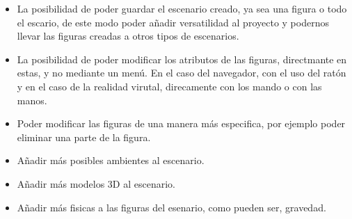 \documentclass[a4paper, 12pt]{book}
\begin{document}
\begin{itemize}
    \item La posibilidad de poder guardar el escenario creado, ya sea una figura o todo el escario, de este modo poder añadir versatilidad al proyecto y podernos llevar las figuras creadas a otros tipos de escenarios.
    \item La posibilidad de poder modificar los atributos de las figuras, directmante en estas, y no mediante un menú. En el caso del navegador, con el uso del ratón y en el caso de la realidad virutal, direcamente con los mando o con las manos.
    \item Poder modificar las figuras de una manera más especifica, por ejemplo poder eliminar una parte de la figura.
    \item Añadir más posibles ambientes al escenario.
    \item Añadir más modelos 3D al escenario.
    \item Añadir más fisicas a las figuras del esenario, como pueden ser, gravedad.
\end{itemize}
\end{document}
